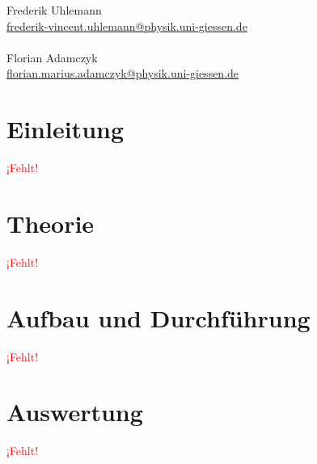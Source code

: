 \documentclass[12pt,a4paper,ngerman]{report}
\providecommand{\fehlt}{\textcolor{red}{{ ¡Fehlt! }}}
\begin{document}
\begin{titlepage}
\begin{minipage}{0.49\textwidth}
\begin{flushright}
				\large{Frederik Uhlemann}\\
				\small{\href{mailto:frederik-vincent.uhlemann@physik.uni-giessen.de}{frederik-vincent.uhlemann@physik.uni-giessen.de}\\~\\
				}
				\large{Florian Adamczyk} \\
				\small{\href{mailto:florian.marius.adamczyk@physik.uni-giessen.de}{florian.marius.adamczyk@physik.uni-giessen.de}\\
			}
		\end{flushright}
	\end{minipage}
	
	\end{titlepage}
	
\setcounter{secnumdepth}{3}
\setcounter{tocdepth}{4}
\tableofcontents


	
\chapter*{Einleitung}
	\fehlt
	\lipsum


\chapter{Theorie}
	\fehlt

\chapter{Aufbau und Durchführung}
	\fehlt
	
	


\chapter{Auswertung}
	\fehlt
\end{document}
